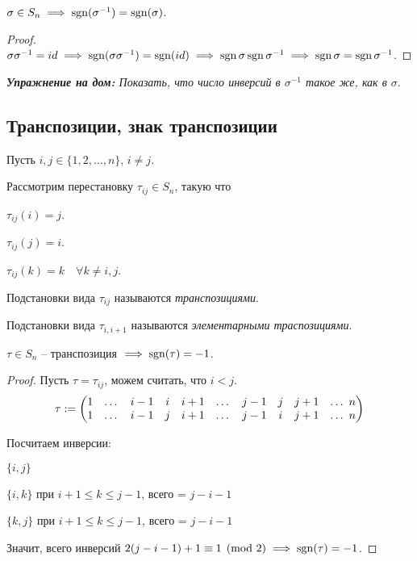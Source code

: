\begin{corollary}
    $\sigma \in S_n \implies \operatorname{\mathop{\mathrm{sgn}}} (\sigma^{-1}) = \operatorname{\mathop{\mathrm{sgn}}}(\sigma)$.
\end{corollary}

\begin{proof}
    $\sigma \sigma^{-1} = id \implies \operatorname{\mathop{\mathrm{sgn}}}(\sigma \sigma^{-1}) = \operatorname{\mathop{\mathrm{sgn}}}(id) \implies \operatorname{\mathop{\mathrm{sgn}}} \sigma \operatorname{\mathop{\mathrm{sgn}}} \sigma^{-1} \implies \operatorname{\mathop{\mathrm{sgn}}} \sigma = \operatorname{\mathop{\mathrm{sgn}}} \sigma^{-1}$.
\end{proof}

\textit{\textbf{Упражнение на дом:} Показать, что число инверсий в $\sigma^{-1}$ такое же, как в $\sigma$}.

\subsection{Транспозиции, знак транспозиции}

Пусть $i, j \in \{1, 2, \dots, n\}$, $i \neq j$.

Рассмотрим перестановку $\tau_{ij} \in S_n$, такую что

$\tau_{ij}(i) = j$.

$\tau_{ij}(j) = i$.

$\tau_{ij}(k) = k \quad \forall k \neq i, j$.

\begin{definition}
    Подстановки вида $\tau_{ij}$ называются \textit{транспозициями}.
\end{definition}

\begin{comment}
    $\tau$ -- траспозиция $\implies \tau^2 = id, \tau^{-1} = \tau$.
\end{comment}

\begin{definition}
    Подстановки вида $\tau_{i, i+1}$ называются \textit{элементарными траспозициями}.
\end{definition}

\begin{lemma}
    $\tau \in S_n$ -- транспозиция $\implies \operatorname{\mathop{\mathrm{sgn}}}(\tau) = -1$.
\end{lemma}

\begin{proof}
    Пусть $\tau = \tau_{ij}$, можем считать, что $i < j$.
    \begin{equation*}
        \tau := \begin{pmatrix}
            1 & \dots & i-1 & i & i + 1 & \dots &
            j - 1 & j & j + 1 & \dots \ n
            \cr
            1 & \dots & i-1 & j & i + 1 & \dots &
            j - 1 & i & j + 1 & \dots \ n
        \end{pmatrix}
    \end{equation*}

    Посчитаем инверсии:

    $\{i, j\}$

    $\{i, k\}$ при $i + 1 \leq k \leq j -1$, всего = $j-i-1$

    $\{k, j\}$ при $i + 1 \leq k \leq j -1$, всего = $j-i-1$

    Значит, всего инверсий $2(j-i-1) + 1 \equiv 1 \pmod{2} \implies \operatorname{\mathop{\mathrm{sgn}}}(\tau) = -1$.
\end{proof}

